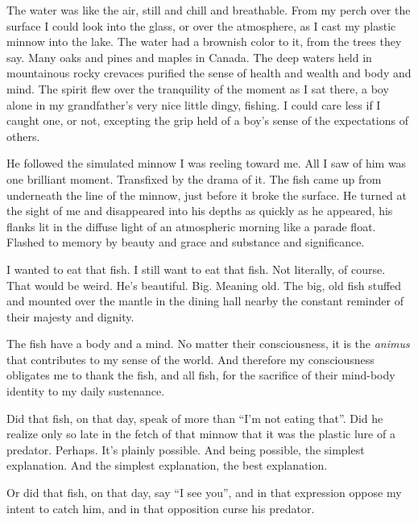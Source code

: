 

The water was like the air, still and chill and breathable.  From my
perch over the surface I could look into the glass, or over the
atmosphere, as I cast my plastic minnow into the lake.  The water had
a brownish color to it, from the trees they say.  Many oaks and pines
and maples in Canada.  The deep waters held in mountainous rocky
crevaces purified the sense of health and wealth and body and mind.
The spirit flew over the tranquility of the moment as I sat there, a
boy alone in my grandfather's very nice little dingy, fishing.  I
could care less if I caught one, or not, excepting the grip held of
a boy's sense of the expectations of others.

He followed the simulated minnow I was reeling toward me.  All I saw
of him was one brilliant moment.  Transfixed by the drama of it.  The
fish came up from underneath the line of the minnow, just before it
broke the surface.  He turned at the sight of me and disappeared into
his depths as quickly as he appeared, his flanks lit in the diffuse
light of an atmospheric morning like a parade float.  Flashed to
memory by beauty and grace and substance and significance.

I wanted to eat that fish.  I still want to eat that fish.  Not
literally, of course.  That would be weird.  He's beautiful.  Big.
Meaning old.  The big, old fish stuffed and mounted over the mantle in
the dining hall nearby the constant reminder of their majesty and
dignity.  

The fish have a body and a mind.  No matter their consciousness, it is
the {\it animus} that contributes to my sense of the world.  And
therefore my consciousness obligates me to thank the fish, and all
fish, for the sacrifice of their mind-body identity to my daily
sustenance.

Did that fish, on that day, speak of more than ``I'm not eating
that''.  Did he realize only so late in the fetch of that minnow that
it was the plastic lure of a predator.  Perhaps.  It's plainly
possible.  And being possible, the simplest explanation.  And the
simplest explanation, the best explanation.

Or did that fish, on that day, say ``I see you'', and in that
expression oppose my intent to catch him, and in that opposition curse
his predator.

\bye
